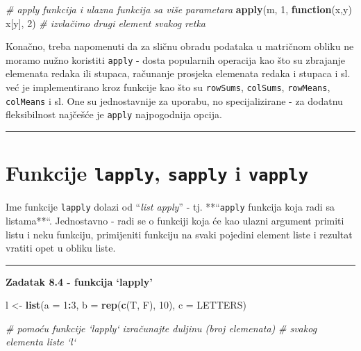 \documentclass[]{book}
\newenvironment{Shaded}{\begin{snugshade}}{\end{snugshade}}
\newcommand{\KeywordTok}[1]{\textcolor[rgb]{0.13,0.29,0.53}{\textbf{#1}}}
\newcommand{\DataTypeTok}[1]{\textcolor[rgb]{0.13,0.29,0.53}{#1}}
\newcommand{\DecValTok}[1]{\textcolor[rgb]{0.00,0.00,0.81}{#1}}
\newcommand{\StringTok}[1]{\textcolor[rgb]{0.31,0.60,0.02}{#1}}
\newcommand{\CommentTok}[1]{\textcolor[rgb]{0.56,0.35,0.01}{\textit{#1}}}
\newcommand{\ControlFlowTok}[1]{\textcolor[rgb]{0.13,0.29,0.53}{\textbf{#1}}}
\newcommand{\OperatorTok}[1]{\textcolor[rgb]{0.81,0.36,0.00}{\textbf{#1}}}
\newcommand{\NormalTok}[1]{#1}
\theoremstyle{definition}
\theoremstyle{definition}
\theoremstyle{definition}
\theoremstyle{remark}
\begin{document}
\begin{Shaded}
\begin{Highlighting}[]
\CommentTok{# apply funkcija i ulazna funkcija sa više parametara}
\KeywordTok{apply}\NormalTok{(m, }\DecValTok{1}\NormalTok{, }\ControlFlowTok{function}\NormalTok{(x,y) x[y], }\DecValTok{2}\NormalTok{)  }\CommentTok{# izvlačimo drugi element svakog retka}
\end{Highlighting}
\end{Shaded}

Konačno, treba napomenuti da za sličnu obradu podataka u matričnom
obliku ne moramo nužno koristiti \texttt{apply} - dosta popularnih
operacija kao što su zbrajanje elemenata redaka ili stupaca, računanje
prosjeka elemenata redaka i stupaca i sl. već je implementirano kroz
funkcije kao što su \texttt{rowSums}, \texttt{colSums},
\texttt{rowMeans}, \texttt{colMeans} i sl. One su jednostavnije za
uporabu, no specijalizirane - za dodatnu fleksibilnost najčešće je
\texttt{apply} najpogodnija opcija.

\begin{center}\rule{0.5\linewidth}{\linethickness}\end{center}

\section{\texorpdfstring{Funkcije \texttt{lapply}, \texttt{sapply} i
\texttt{vapply}}{Funkcije lapply, sapply i vapply}}\label{funkcije-lapply-sapply-i-vapply}

Ime funkcije \texttt{lapply} dolazi od ``\emph{list apply}'' - tj.
**``\texttt{apply} funkcija koja radi sa listama**``. Jednostavno - radi
se o funkciji koja će kao ulazni argument primiti listu i neku funkciju,
primijeniti funkciju na svaki pojedini element liste i rezultat vratiti
opet u obliku liste.

\begin{center}\rule{0.5\linewidth}{\linethickness}\end{center}

\textbf{Zadatak 8.4 - funkcija `lapply'}

\begin{Shaded}
\begin{Highlighting}[]
\NormalTok{l <-}\StringTok{ }\KeywordTok{list}\NormalTok{(}\DataTypeTok{a =} \DecValTok{1}\OperatorTok{:}\DecValTok{3}\NormalTok{, }\DataTypeTok{b =} \KeywordTok{rep}\NormalTok{(}\KeywordTok{c}\NormalTok{(T, F), }\DecValTok{10}\NormalTok{), }\DataTypeTok{c =}\NormalTok{ LETTERS)}

\CommentTok{# pomoću funkcije `lapply` izračunajte duljinu (broj elemenata) }
\CommentTok{# svakog elementa liste `l`}
\end{Highlighting}
\end{Shaded}
\end{document}
